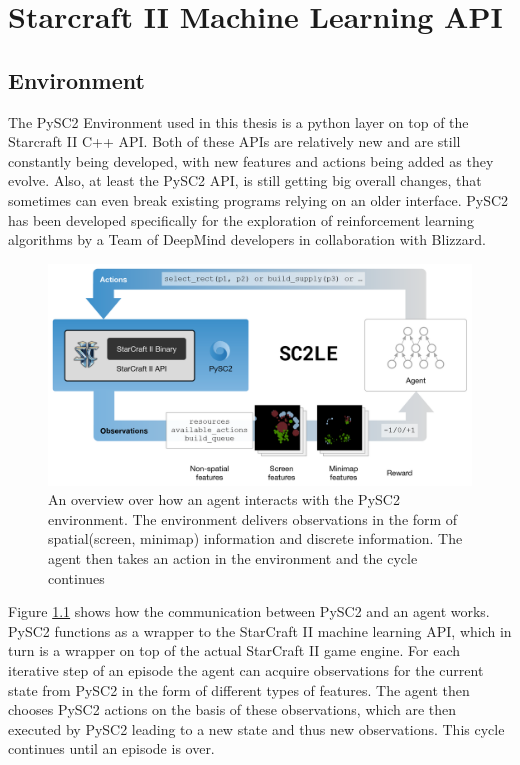 
\chapter{Starcraft II Machine Learning API} %

\label{chap_api} %



\section{Environment}
The PySC2 Environment used in this thesis is a python layer on top of the Starcraft II C++ API.
Both of these APIs are relatively new and are still constantly being developed, with new features and actions being added as they evolve. Also, at least the PySC2 API, is still getting big overall changes, that sometimes can even break existing programs relying on an older interface.
PySC2 has been developed specifically for the exploration of reinforcement learning algorithms by a Team of DeepMind developers in collaboration with Blizzard.

\begin{figure}[htb]
  \centering
      \includegraphics[width=1\textwidth]{Figures/sc2le/sc2le_overview.png}
  \caption{An overview over how an agent interacts with the PySC2 environment. The environment delivers observations in the form of spatial(screen, minimap) information and discrete information. The agent then takes an action in the environment and the cycle continues\citep{DBLP:journals/corr/dmsc2} }
  \label{fig:pysc2_overview}
\end{figure}

Figure \ref{fig:pysc2_overview} shows how the communication between PySC2 and an agent works. PySC2 functions as a wrapper to the StarCraft II machine learning API, which in turn is a wrapper on top of the actual StarCraft II game engine. For each iterative step of an episode the agent can acquire observations for the current state from PySC2 in the form of different types of features. The agent then chooses PySC2 actions on the basis of these observations, which are then executed by PySC2 leading to a new state and thus new observations. This cycle continues until an episode is over.    



